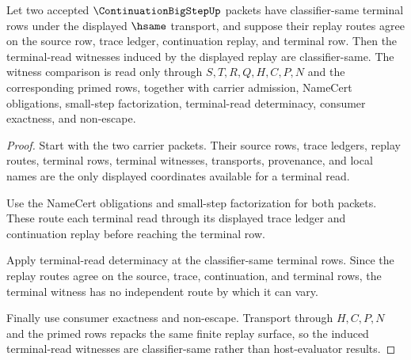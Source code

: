 \begin{theorem}
\label{thm:continuation-big-step-result-stability}
Let two accepted $\ContinuationBigStepUp$ packets have classifier-same terminal rows under the displayed $\hsame$ transport, and suppose their replay routes agree on the source row, trace ledger, continuation replay, and terminal row. Then the terminal-read witnesses induced by the displayed replay are classifier-same. The witness comparison is read only through $S,T,R,Q,H,C,P,N$ and the corresponding primed rows, together with carrier admission, NameCert obligations, small-step factorization, terminal-read determinacy, consumer exactness, and non-escape.
\end{theorem}
\begin{proof}
Start with the two carrier packets. Their source rows, trace ledgers, replay routes, terminal rows, terminal witnesses, transports, provenance, and local names are the only displayed coordinates available for a terminal read.

Use the NameCert obligations and small-step factorization for both packets. These route each terminal read through its displayed trace ledger and continuation replay before reaching the terminal row.

Apply terminal-read determinacy at the classifier-same terminal rows. Since the replay routes agree on the source, trace, continuation, and terminal rows, the terminal witness has no independent route by which it can vary.

Finally use consumer exactness and non-escape. Transport through $H,C,P,N$ and the primed rows repacks the same finite replay surface, so the induced terminal-read witnesses are classifier-same rather than host-evaluator results.
\end{proof}

